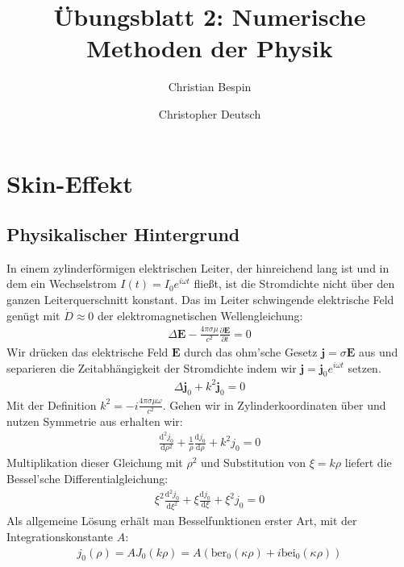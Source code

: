 \documentclass[10pt,a4paper]{article}
\author{Christian Bespin \and Christopher Deutsch}
\title{Übungsblatt 2: Numerische Methoden der Physik}
\begin{document}
\maketitle

\setcounter{section}{1}

\section{Skin-Effekt}

\subsection{Physikalischer Hintergrund}

In einem zylinderförmigen elektrischen Leiter, der hinreichend lang ist und in dem ein Wechselstrom $I(t)=I_0 e^{i \omega t}$ fließt, ist die Stromdichte nicht über den ganzen Leiterquerschnitt konstant. Das im Leiter schwingende elektrische Feld genügt mit $\dot D \approx 0$ der elektromagnetischen Wellengleichung:
\begin{align}
	\Delta\mathbf{E} - \frac{4\pi\sigma\mu}{c^2} \frac{\partial \mathbf{E}}{\partial t} = 0
	\label{eq:maxwellgleichung}
\end{align}
Wir drücken das elektrische Feld $\mathbf{E}$ durch das ohm'sche Gesetz $\mathbf{j} = \sigma \mathbf{E}$ aus und separieren die Zeitabhängigkeit der Stromdichte \cite{healdmarion} indem wir $\mathbf{j} = \mathbf{j}_0 e^{i \omega t}$ setzen.
\begin{align}
	\Delta\mathbf{j}_0 + k^2 \mathbf{j}_0 = 0
	\label{eq:maxwellgleichungJ}
\end{align}
Mit der Definition $k^2 = - i \frac{4 \pi \sigma \mu \omega}{c^2}$. Gehen wir in Zylinderkoordinaten über und nutzen Symmetrie aus erhalten wir:
\begin{align}
	\frac{\mathrm{d}^2 j_0}{\mathrm{d}\rho^2} + \frac{1}{\rho}\frac{\mathrm{d}j_0}{\mathrm{d}\rho} + k^2 j_0 = 0
	\label{eq:besseldgl} 
\end{align}
Multiplikation dieser Gleichung mit $\rho^2$ und Substitution von $\xi = k \rho$ liefert die Bessel'sche Differentialgleichung:
\begin{align}
  \xi^2 \frac{\mathrm{d}^2j_0}{\mathrm{d}\xi^2} + \xi \frac{\mathrm{d}j_0}{\mathrm{d}\xi} + \xi^2 j_0 = 0
\end{align}
Als allgemeine Lösung erhält man Besselfunktionen erster Art, mit der Integrationskonstante $A$:
\begin{align}
	j_0(\rho)=A J_0(k \rho) = A(\mathrm{ber}_0(\kappa \rho)+i\mathrm{bei}_0(\kappa \rho))
\end{align}
\end{document}
